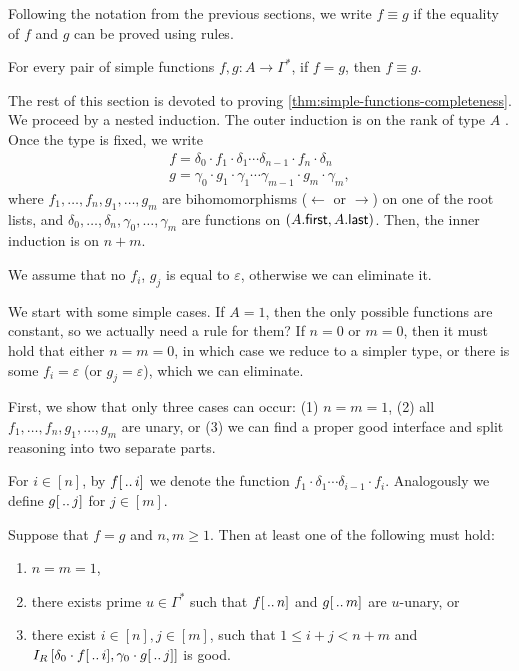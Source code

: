 
Following the notation from the previous sections, we write $f \equiv g$ if the equality of $f$ and $g$ can be proved using rules.

\begin{theorem}\label{thm:simple-functions-completeness}
    For every pair of simple functions $f,g : A \to \Gamma^*$, if $f = g$, then $f \equiv g$.
\end{theorem}

The rest of this section is devoted to proving \cref{thm:simple-functions-completeness}. We proceed by a nested induction. The outer induction is on the rank of type $A$ . Once the type is fixed, we write
\begin{gather*}
    f = \delta_0 \cdot f_1 \cdot \delta_1 \cdots \delta_{n-1} \cdot f_n \cdot \delta_n \\
    g = \gamma_0 \cdot g_1 \cdot \gamma_1 \cdots \gamma_{m-1} \cdot g_m \cdot \gamma_m,
\end{gather*}
where $f_1, \dots, f_n, g_1, \dots, g_m$ are bihomomorphisms ($\leftarrow$ or $\rightarrow$) on one of the root lists, and $\delta_0, \dots, \delta_n, \gamma_0, \dots, \gamma_m$ are functions on $(A . \mathsf{first}, A . \mathsf{last})$. Then, the inner induction is on $n+m$.

We assume that no $f_i$, $g_j$ is equal to $\varepsilon$, otherwise we can eliminate it.

We start with some simple cases. If $A = 1$, then the only possible functions are constant, so we actually need a rule for them?  If $n = 0$ or $m = 0$, then it must hold that either $n = m = 0$, in which case we reduce to a simpler type, or there is some $f_i = \varepsilon$ (or $g_j = \varepsilon$), which we can eliminate.

First, we show that only three cases can occur: (1) $n = m = 1$, (2) all $f_1, \dots, f_n,g_1, \dots, g_m$ are unary, or (3) we can find a proper good interface and split reasoning into two separate parts.

For $i \in [n]$, by $f[\,..\,i]$ we denote the function $f_1 \cdot \delta_1 \cdots \delta_{i-1} \cdot f_i$. Analogously we define $g[\,..\,j]$ for $j \in [m]$.

\begin{lemma}\label{lemma:the-only-three-cases-for-simple-functions}
    Suppose that $f = g$ and $n, m \geq 1$. Then at least one of the following must hold:
    \begin{enumerate}
        \item $n = m = 1$,
        \item there exists prime $u \in \Gamma^*$ such that $f[\,..\,n]$ and $g[\,..\,m]$ are $u$-unary, or
        \item there exist $i \in [n], j \in [m]$, such that $1 \leq i + j < n+m$ and $I_R \left[ \delta_0 \cdot f[\,..\,i], \gamma_0 \cdot g[\,..\,j] \right]$ is good.
    \end{enumerate}
\end{lemma}


